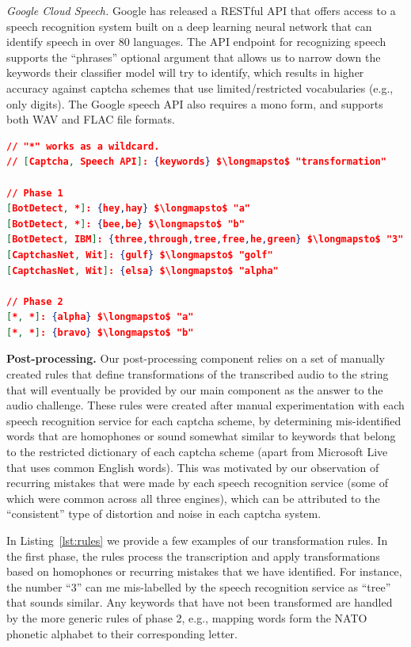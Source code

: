 \emph{Google Cloud Speech.}  Google has released a RESTful API that offers access to a speech recognition system built on 
a deep learning neural network that can identify speech in over 80 languages. The API endpoint for recognizing speech supports
the ``phrases'' optional argument that allows us to narrow down the keywords their classifier model will try to identify, which 
results in higher accuracy against captcha schemes that use limited/restricted vocabularies (e.g., only digits). The Google
speech API also requires a mono form, and supports both WAV and FLAC file formats.

\begin{lstlisting}[language=json,firstnumber=1,mathescape=true,caption={Subset of rules used by our post-processing component for
converting keywords in the transcription to the required transformation for the captcha's solution.},label={lst:rules}]
// "*" works as a wildcard. 
// [Captcha, Speech API]: {keywords} $\longmapsto$ "transformation"

// Phase 1
[BotDetect, *]: {hey,hay} $\longmapsto$ "a"
[BotDetect, *]: {bee,be} $\longmapsto$ "b"
[BotDetect, IBM]: {three,through,tree,free,he,green} $\longmapsto$ "3"
[CaptchasNet, Wit]: {gulf} $\longmapsto$ "golf"
[CaptchasNet, Wit]: {elsa} $\longmapsto$ "alpha"

// Phase 2
[*, *]: {alpha} $\longmapsto$ "a"
[*, *]: {bravo} $\longmapsto$ "b"
\end{lstlisting}

\textbf{Post-processing.} Our post-processing component relies on a set of manually created rules that define transformations
of the transcribed audio to the string that will eventually be provided by our main component as the answer to the audio challenge.
These rules were created after manual experimentation with each speech recognition service for each captcha scheme,
by determining mis-identified words that are homophones or sound somewhat similar to keywords that belong to the 
restricted dictionary of each captcha scheme (apart from Microsoft Live that uses common English words). This was motivated
by our observation of recurring mistakes that were made by each speech recognition service (some of which were common across
all three engines), which can be attributed to the ``consistent'' type of distortion and noise in each captcha system.

In Listing~\ref{lst:rules} we provide a few examples of our transformation rules. In the first phase, the rules process the 
transcription and apply transformations based on homophones or recurring mistakes that we have identified. For instance, 
the number ``3'' can me mis-labelled by the speech recognition service as ``tree'' that sounds similar.
Any keywords that have not been transformed are handled by the more generic rules of phase 2, e.g., mapping 
words form the NATO phonetic alphabet to their corresponding letter.

